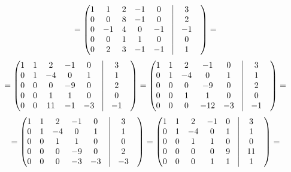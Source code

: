 \documentclass[a4paper,12pt]{article}
\begin{document}
\[
=
\begin{pmatrix}
1 & 1 & 2 & -1 & 0 & \vrule &3 & \\
0 & 0 & 8 & -1 & 0 & \vrule &2 & \\
0 & -1 & 4 & 0 & -1 & \vrule &-1 & \\
0 & 0 & 1 & 1 & 0 & \vrule &0 & \\
0 & 2 & 3 & -1 & -1 & \vrule &1 & \\
\end{pmatrix}
=
\]
\[
=
\begin{pmatrix}
1 & 1 & 2 & -1 & 0 & \vrule &3 & \\
0 & 1 & -4 & 0 & 1 & \vrule &1 & \\
0 & 0 & 0 & -9 & 0 & \vrule &2 & \\
0 & 0 & 1 & 1 & 0 & \vrule &0 & \\
0 & 0 & 11 & -1 & -3 & \vrule &-1 & \\
\end{pmatrix}
=
\begin{pmatrix}
1 & 1 & 2 & -1 & 0 & \vrule &3 & \\
0 & 1 & -4 & 0 & 1 & \vrule &1 & \\
0 & 0 & 0 & -9 & 0 & \vrule &2 & \\
0 & 0 & 1 & 1 & 0 & \vrule &0 & \\
0 & 0 & 0 & -12 & -3 & \vrule &-1 & \\
\end{pmatrix}
=
\]
\[
=
\begin{pmatrix}
1 & 1 & 2 & -1 & 0 & \vrule &3 & \\
0 & 1 & -4 & 0 & 1 & \vrule &1 & \\
0 & 0 & 1 & 1 & 0 & \vrule &0 & \\
0 & 0 & 0 & -9 & 0 & \vrule &2 & \\
0 & 0 & 0 & -3 & -3 & \vrule &-3 & \\
\end{pmatrix}
=
\begin{pmatrix}
1 & 1 & 2 & -1 & 0 & \vrule &3 & \\
0 & 1 & -4 & 0 & 1 & \vrule &1 & \\
0 & 0 & 1 & 1 & 0 & \vrule &0 & \\
0 & 0 & 0 & 0 & 9 & \vrule &11 & \\
0 & 0 & 0 & 1 & 1 & \vrule &1 & \\
\end{pmatrix}
=
\]
\end{document}

